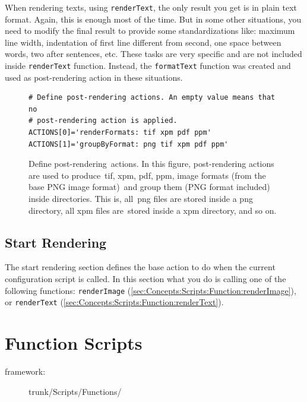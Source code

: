 When rendering texts, using \texttt{renderText}, the only result you
get is in plain text format. Again, this is enough most of the time.
But in some other situations, you need to modify the final result to
provide some standardizations like: maximum line width, indentation of
first line different from second, one space between words, two after
sentences, etc. These tasks are very specific and are not included
inside \texttt{renderText} function. Instead, the \texttt{formatText}
function was created and used as post-rendering action in these
situations.

\begin{figure}[!hbp]
\hrulefill
\begin{verbatim}
# Define post-rendering actions. An empty value means that no
# post-rendering action is applied.
ACTIONS[0]='renderFormats: tif xpm pdf ppm'
ACTIONS[1]='groupByFormat: png tif xpm pdf ppm'
\end{verbatim}
\hrulefill
\caption[Define post-rendering actions.]{Define post-rendering\
actions. In this figure, post-rendering actions are used to produce\
tif, xpm, pdf, ppm, image formats (from the base PNG image format)\
and group them (PNG format included) inside directories. This is, all\
png files are stored inside a png directory, all xpm files are\
stored inside a xpm directory, and so on.%
   \label{fig:Concepts:Scripts:Configuration:ACTIONS}}
\end{figure}

\subsection{Start Rendering}

The start rendering section defines the base action to do when the
current configuration script is called. In this section what you do is
calling one of the following functions: \texttt{renderImage}
(\autoref{sec:Concepts:Scripts:Function:renderImage}), or
\texttt{renderText}
(\autoref{sec:Concepts:Scripts:Function:renderText}).

\section{Function Scripts}
\hypertarget{sec:Concepts:Scripts:Function}{}
\label{sec:Concepts:Scripts:Function}

\begin{description}
\item[framework:] trunk/Scripts/Functions/
\end{description}

